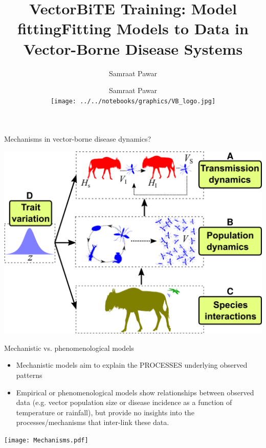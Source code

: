 \documentclass[xcolor=x11names,compress]{beamer}
\title{VectorBiTE Training: Model fitting}
\author{Samraat Pawar}
\renewcommand{\(}{\begin{columns}}
\renewcommand{\)}{\end{columns}}
\newcommand{\<}[1]{\begin{column}{#1}}
\renewcommand{\>}{\end{column}}
\begin{document}
\begin{frame}[plain]

\title{Fitting Models to Data in Vector-Borne Disease Systems}
\author{
    Samraat Pawar\\
    \vspace{20pt}
  \centering
  \texttt{[image: ../../notebooks/graphics/VB\_logo.jpg]}
}
 
\titlepage
\end{frame}

\begin{frame}{Mechanisms in vector-borne disease dynamics?}

\begin{center}
	\includegraphics[width=.8\textwidth]{VecTraitOverview.png}	
\end{center}

\end{frame}
	
\begin{frame}{Mechanistic vs. phenomenological models}

	\begin{itemize}\itemsep4pt
		  \item Mechanistic models aim to explain the PROCESSES underlying 
		  observed patterns
 
		 \item Empirical or phenomenological models show relationships 
		 between observed data (e.g. vector population size or disease incidence as a function of temperature or rainfall), but provide no insights into the processes/mechanisms that inter-link these data.
	  \end{itemize}
 
 \pause
	 
  \begin{center}
	  \texttt{[image: Mechanisms.pdf]}
  \end{center} 
 
 \end{frame}
 
\end{document}
